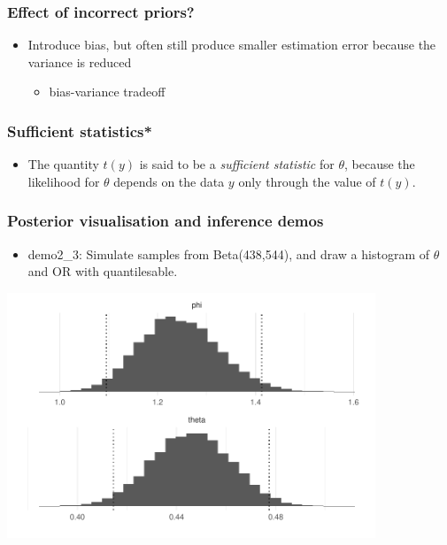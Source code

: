 \documentclass[english,t]{beamer}
\begin{document}
\begin{frame}

  \frametitle{Effect of incorrect priors?}
  
  \begin{itemize}
  \item Introduce bias, but often still produce smaller estimation
    error because the variance is reduced
    \begin{itemize}
    \item bias-variance tradeoff
    \end{itemize}
  \end{itemize}  
  
\end{frame}

\begin{frame}
  \frametitle{Sufficient statistics*}

  \begin{itemize}
  \item The quantity $t(y)$ is said to be a {\em sufficient statistic}
    for $\theta$, because the likelihood for $\theta$ depends on the
    data $y$ only through the value of $t(y)$.
  \end{itemize}

\end{frame}

\begin{frame}
  \frametitle{Posterior visualisation and inference demos}

  \begin{itemize}
  \item demo2\_3: Simulate samples from Beta(438,544), and draw
    a histogram of $\theta$ and OR with quantilesable.
  \end{itemize}
  \vspace{-\baselineskip}
  \begin{center}
  \includegraphics[width=11cm]{figs/demo2_3.pdf}
\end{center}
\end{frame}
\end{document}
